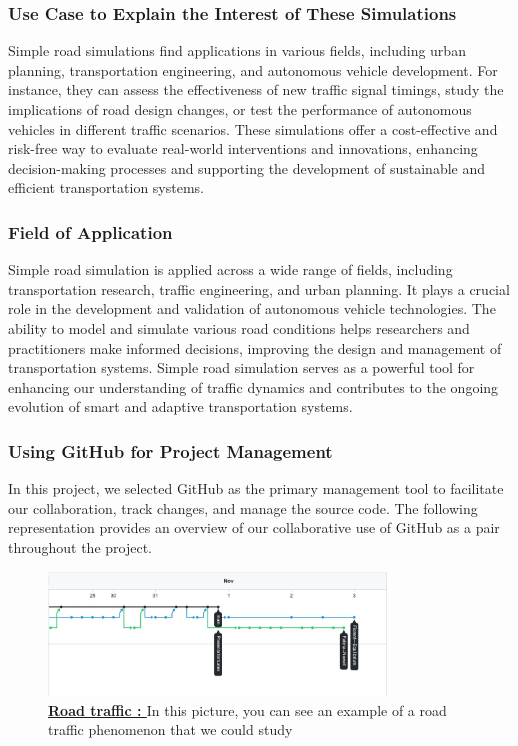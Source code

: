 \documentclass{article}
\begin{document}
		\subsubsection{Use Case to Explain the Interest of These Simulations}
		Simple road simulations find applications in various fields, including urban planning, transportation engineering, and autonomous vehicle development. For instance, they can assess the effectiveness of new traffic signal timings, study the implications of road design changes, or test the performance of autonomous vehicles in different traffic scenarios. These simulations offer a cost-effective and risk-free way to evaluate real-world interventions and innovations, enhancing decision-making processes and supporting the development of sustainable and efficient transportation systems.
		
		\subsubsection{Field of Application}
		Simple road simulation is applied across a wide range of fields, including transportation research, traffic engineering, and urban planning. It plays a crucial role in the development and validation of autonomous vehicle technologies. The ability to model and simulate various road conditions helps researchers and practitioners make informed decisions, improving the design and management of transportation systems. Simple road simulation serves as a powerful tool for enhancing our understanding of traffic dynamics and contributes to the ongoing evolution of smart and adaptive transportation systems.
		
	
	\subsubsection{Using GitHub for Project Management}
	In this project, we selected GitHub as the primary management tool to facilitate our collaboration, track changes, and manage the source code. The following representation provides an overview of our collaborative use of GitHub as a pair throughout the project.
	\begin{figure}[H]
		\centering
		\includegraphics[width=0.8\textwidth]{GitHub.jpg}
		\caption{\textbf{\underline{Road traffic : }} In this picture, you can see an example of a road traffic phenomenon that we could study}
		\label{fig:GitHub}
	\end{figure}
	
\end{document}
